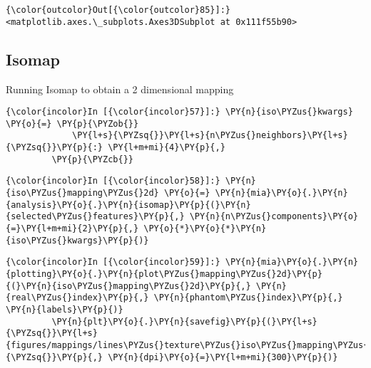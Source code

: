             \begin{Verbatim}[commandchars=\\\{\}]
{\color{outcolor}Out[{\color{outcolor}85}]:} <matplotlib.axes.\_subplots.Axes3DSubplot at 0x111f55b90>
\end{Verbatim}

    \subsection{Isomap}\label{isomap}

Running Isomap to obtain a 2 dimensional mapping

    \begin{Verbatim}[commandchars=\\\{\}]
{\color{incolor}In [{\color{incolor}57}]:} \PY{n}{iso\PYZus{}kwargs} \PY{o}{=} \PY{p}{\PYZob{}}
             \PY{l+s}{\PYZsq{}}\PY{l+s}{n\PYZus{}neighbors}\PY{l+s}{\PYZsq{}}\PY{p}{:} \PY{l+m+mi}{4}\PY{p}{,}
         \PY{p}{\PYZcb{}}
\end{Verbatim}

    \begin{Verbatim}[commandchars=\\\{\}]
{\color{incolor}In [{\color{incolor}58}]:} \PY{n}{iso\PYZus{}mapping\PYZus{}2d} \PY{o}{=} \PY{n}{mia}\PY{o}{.}\PY{n}{analysis}\PY{o}{.}\PY{n}{isomap}\PY{p}{(}\PY{n}{selected\PYZus{}features}\PY{p}{,} \PY{n}{n\PYZus{}components}\PY{o}{=}\PY{l+m+mi}{2}\PY{p}{,} \PY{o}{*}\PY{o}{*}\PY{n}{iso\PYZus{}kwargs}\PY{p}{)}
\end{Verbatim}

    \begin{Verbatim}[commandchars=\\\{\}]
{\color{incolor}In [{\color{incolor}59}]:} \PY{n}{mia}\PY{o}{.}\PY{n}{plotting}\PY{o}{.}\PY{n}{plot\PYZus{}mapping\PYZus{}2d}\PY{p}{(}\PY{n}{iso\PYZus{}mapping\PYZus{}2d}\PY{p}{,} \PY{n}{real\PYZus{}index}\PY{p}{,} \PY{n}{phantom\PYZus{}index}\PY{p}{,} \PY{n}{labels}\PY{p}{)}
         \PY{n}{plt}\PY{o}{.}\PY{n}{savefig}\PY{p}{(}\PY{l+s}{\PYZsq{}}\PY{l+s}{figures/mappings/lines\PYZus{}texture\PYZus{}iso\PYZus{}mapping\PYZus{}2d.png}\PY{l+s}{\PYZsq{}}\PY{p}{,} \PY{n}{dpi}\PY{o}{=}\PY{l+m+mi}{300}\PY{p}{)}
\end{Verbatim}

    \begin{center}
    \end{center}
    { \hspace*{\fill} \\}

